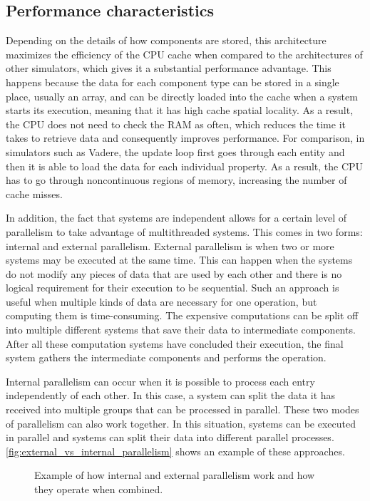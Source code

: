 \documentclass[twoside, 11pt]{article}
\begin{document}
\subsection{Performance characteristics}

Depending on the details of how components are stored, this architecture maximizes the efficiency of the CPU cache when compared to the architectures of other simulators, which gives it a substantial performance advantage. This happens because the data for each component type can be stored in a single place, usually an array, and can be directly loaded into the cache when a system starts its execution, meaning that it has high cache spatial locality. As a result, the CPU does not need to check the RAM as often, which reduces the time it takes to retrieve data and consequently improves performance. For comparison, in simulators such as Vadere, the update loop first goes through each entity and then it is able to load the data for each individual property. As a result, the CPU has to go through noncontinuous regions of memory, increasing the number of cache misses.

In addition, the fact that systems are independent allows for a certain level of parallelism to take advantage of multithreaded systems. This comes in two forms: internal and external parallelism. External parallelism is when two or more systems may be executed at the same time. This can happen when the systems do not modify any pieces of data that are used by each other and there is no logical requirement for their execution to be sequential. Such an approach is useful when multiple kinds of data are necessary for one operation, but computing them is time-consuming. The expensive computations can be split off into multiple different systems that save their data to intermediate components. After all these computation systems have concluded their execution, the final system gathers the intermediate components and performs the operation. 

Internal parallelism can occur when it is possible to process each entry independently of each other. In this case, a system can split the data it has received into multiple groups that can be processed in parallel. These two modes of parallelism can also work together. In this situation, systems can be executed in parallel and systems can split their data into different parallel processes. \autoref{fig:external_vs_internal_parallelism} shows an example of these approaches.

\begin{figure}
  \centering
  
  \caption[External and internal parallelism comparison]{Example of how internal and external parallelism work and how they operate when combined.}
  \label{fig:external_vs_internal_parallelism}
\end{figure}
\end{document}
